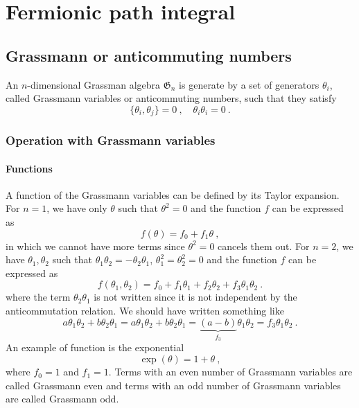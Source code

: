 \part{Fermionic path integral}

\chapter{Grassmann or anticommuting numbers}

    An $n$-dimensional Grassman algebra $\mathfrak G_n$ is generate by a set of generators $\theta_i$, called Grassmann variables or anticommuting numbers, such that they satisfy
    \begin{equation*}
        \{\theta_i, \theta_j\} = 0 ~, \quad \theta_i \theta_i = 0~.
    \end{equation*}

\section{Operation with Grassmann variables} 

\subsection{Functions}

    A function of the Grassmann variables can be defined by its Taylor expansion. For $n = 1$, we have only $\theta$ such that $\theta^2 = 0$ and the function $f$ can be expressed as
    \begin{equation*}
        f(\theta) = f_0 + f_1 \theta ~,
    \end{equation*}
    in which we cannot have more terms since $\theta^2 = 0$ cancels them out. For $n=2$, we have $\theta_1, \theta_2$ such that $\theta_1 \theta_2 = -\theta_2 \theta_1$, $\theta_1^2 = \theta_2^2 = 0$ and the function $f$ can be expressed as
    \begin{equation*}
        f(\theta_1, \theta_2) = f_0 + f_1 \theta_1 + f_2 \theta_2 + f_3 \theta_1 \theta_2 ~.
    \end{equation*} 
    where the term $\theta_2 \theta_1$ is not written since it is not independent by the anticommutation relation. We should have written something like 
    \begin{equation*}
        a \theta_1 \theta_2 + b \theta_2 \theta_1 = a \theta_1 \theta_2 + b \theta_2 \theta_1 = \underbrace{(a - b)}_{f_3} \theta_1 \theta_2 = f_3 \theta_1 \theta_2 ~.
    \end{equation*}
    An example of function is the exponential 
    \begin{equation*}
        \exp(\theta) = 1 + \theta ~,
    \end{equation*}
    where $f_0 = 1$ and $f_1 = 1$. Terms with an even number of Grassmann variables are called Grassmann even and terms with an odd number of Grassmann variables are called Grassmann odd.

